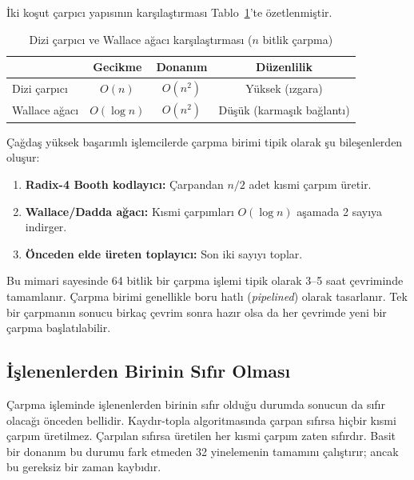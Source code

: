İki koşut çarpıcı yapısının karşılaştırması Tablo~\ref{tab:dizi-vs-wallace}'te özetlenmiştir.

\begin{table}[htbp]
\centering
\caption{Dizi çarpıcı ve Wallace ağacı karşılaştırması ($n$ bitlik çarpma)}
\label{tab:dizi-vs-wallace}
\small
\begin{tabular}{l c c c}
\toprule
& \textbf{Gecikme} & \textbf{Donanım} & \textbf{Düzenlilik} \\
\midrule
Dizi çarpıcı & $O(n)$ & $O(n^2)$ & Yüksek (ızgara) \\
Wallace ağacı & $O(\log n)$ & $O(n^2)$ & Düşük (karmaşık bağlantı) \\
\bottomrule
\end{tabular}
\end{table}

\FloatBarrier
\begin{bilginot}
Çağdaş y{\"u}ksek ba{\c{s}}ar{\i}ml{\i} i{\c{s}}lemcilerde \c{c}arpma birimi tipik olarak {\c{s}}u bile{\c{s}}enlerden olu{\c{s}}ur:
\begin{enumerate}[nosep]
    \item \textbf{Radix-4 Booth kodlayıcı:} Çarpandan $n/2$ adet kısmi çarpım üretir.
    \item \textbf{Wallace/Dadda ağacı:} Kısmi çarpımları $O(\log n)$ aşamada 2 sayıya indirger.
    \item \textbf{Önceden elde üreten toplayıcı:} Son iki sayıyı toplar.
\end{enumerate}
Bu mimari sayesinde 64 bitlik bir çarpma işlemi tipik olarak 3--5 saat çevriminde tamamlanır. Çarpma birimi genellikle boru hatlı (\emph{pipelined}) olarak tasarlanır. Tek bir çarpmanın sonucu birkaç çevrim sonra hazır olsa da her çevrimde yeni bir çarpma başlatılabilir.
\end{bilginot}

\subsection{İşlenenlerden Birinin Sıfır Olması}

Çarpma işleminde işlenenlerden birinin sıfır olduğu durumda sonucun da sıfır olacağı önceden bellidir. Kaydır-topla algoritmasında çarpan sıfırsa hiçbir kısmi çarpım üretilmez. Çarpılan sıfırsa üretilen her kısmi çarpım zaten sıfırdır. Basit bir donanım bu durumu fark etmeden 32 yinelemenin tamamını çalıştırır; ancak bu gereksiz bir zaman kaybıdır.

